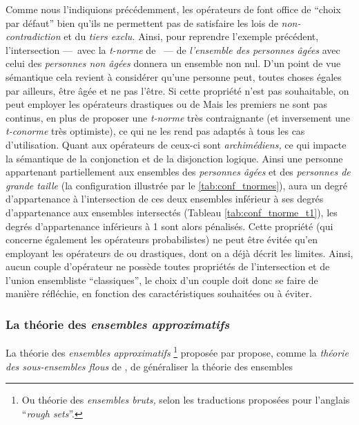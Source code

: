 Comme nous l'indiquions précédemment, les opérateurs de
\textcite{Zadeh1965} font office de \enquote{choix par défaut} bien
qu'ils ne permettent pas de satisfaire les lois de
\emph{non-contradiction} et du \emph{tiers exclu.} Ainsi, pour
reprendre l'exemple précédent, l'intersection ---~avec la
\emph{t-norme} de \textcite{Zadeh1965}~--- de \emph{l'ensemble des
  personnes âgées} avec celui des \emph{personnes non âgées} donnera
un ensemble non nul. D'un point de vue sémantique cela revient à
considérer qu'une personne peut, toutes choses égales par ailleurs,
être âgée et ne pas l'être. Si cette propriété n'est pas souhaitable,
on peut employer les opérateurs drastiques ou de 
Mais les premiers ne sont pas continus, en plus de proposer une
\emph{t-norme} très contraignante (et inversement une \emph{t-conorme}
très optimiste), ce qui ne les rend pas adaptés à tous les cas
d'utilisation. Quant aux opérateurs de  ceux-ci sont
\emph{archimédiens,} ce qui impacte la sémantique de la conjonction et
de la disjonction logique. Ainsi une personne appartenant
partiellement aux ensembles des \emph{personnes âgées} et des
\emph{personnes de grande taille} (\ie la configuration illustrée par
le \autoref{tab:conf_tnormes}), aura un degré d'appartenance à
l'intersection de ces deux ensembles inférieur à ses degrés
d'appartenance aux ensembles intersectés (Tableau
\ref{tab:conf_tnorme_t1}), les degrés d'appartenance inférieurs à 1
sont alors pénalisés. Cette propriété (qui concerne également les
opérateurs probabilistes) ne peut être évitée qu'en employant les
opérateurs de \textcite{Zadeh1965} ou drastiques, dont on a déjà
décrit les limites. Ainsi, aucun couple d'opérateur ne possède toutes
propriétés de l'intersection et de l'union ensembliste
\enquote{classiques}, le choix d'un couple doit donc se faire de
manière réfléchie, en fonction des caractéristiques souhaitées ou à
éviter.

\subsubsection{La théorie des \emph{ensembles approximatifs}}


La théorie des \emph{ensembles approximatifs} \footnote{Ou théorie des
  \emph{ensembles bruts,} selon les traductions proposées pour
  l'anglais \foreignquote{english}{\emph{rough sets}}.} proposée par
\textcite{Pawlak1982} propose, comme la \emph{théorie des
  sous-ensembles flous} de \textcite{Zadeh1965}, de généraliser la
théorie des ensembles

